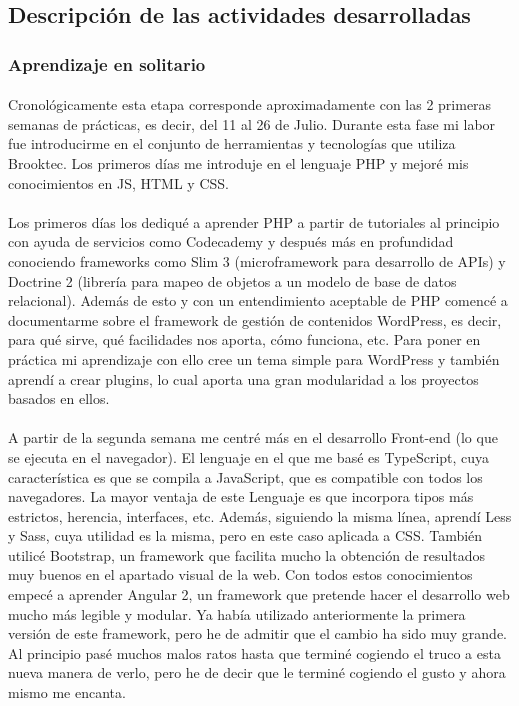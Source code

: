 \documentclass[10pt, a4paper,spanish]{article}
\begin{document}
        \subsection{Descripción de las actividades desarrolladas}

            \subsubsection{Aprendizaje en solitario}

                \paragraph{}
                Cronológicamente esta etapa corresponde aproximadamente con las 2 primeras semanas de prácticas, es decir, del 11 al 26 de Julio. Durante esta fase mi labor fue introducirme en el conjunto de herramientas y tecnologías que utiliza Brooktec. Los primeros días me introduje en el lenguaje PHP y mejoré mis conocimientos en JS, HTML y CSS.

                \paragraph{}
                Los primeros días los dediqué a aprender PHP a partir de tutoriales al principio con ayuda de servicios como Codecademy y después más en profundidad conociendo frameworks como Slim 3 (microframework para desarrollo de APIs) y Doctrine 2 (librería para mapeo de objetos a un modelo de base de datos relacional). Además de esto y con un entendimiento aceptable de PHP comencé a documentarme sobre el framework de gestión de contenidos WordPress, es decir, para qué sirve, qué facilidades nos aporta, cómo funciona, etc. Para poner en práctica mi aprendizaje con ello cree un tema simple para WordPress y también aprendí a crear plugins, lo cual aporta una gran modularidad a los proyectos basados en ellos.

                \paragraph{}
                A partir de la segunda semana me centré más en el desarrollo Front-end (lo que se ejecuta en el navegador). El lenguaje en el que me basé es TypeScript, cuya característica es que se compila a JavaScript, que es compatible con todos los navegadores. La mayor ventaja de este Lenguaje es que incorpora tipos más estrictos, herencia, interfaces, etc. Además, siguiendo la misma línea, aprendí Less y Sass, cuya utilidad es la misma, pero en este caso aplicada a CSS. También utilicé Bootstrap, un framework que facilita mucho la obtención de resultados muy buenos en el apartado visual de la web. Con todos estos conocimientos empecé a aprender Angular 2, un framework que pretende hacer el desarrollo web mucho más legible y modular. Ya había utilizado anteriormente la primera versión de este framework, pero he de admitir que el cambio ha sido muy grande. Al principio pasé muchos malos ratos hasta que terminé cogiendo el truco a esta nueva manera de verlo, pero he de decir que le terminé cogiendo el gusto y ahora mismo me encanta.
\end{document}
